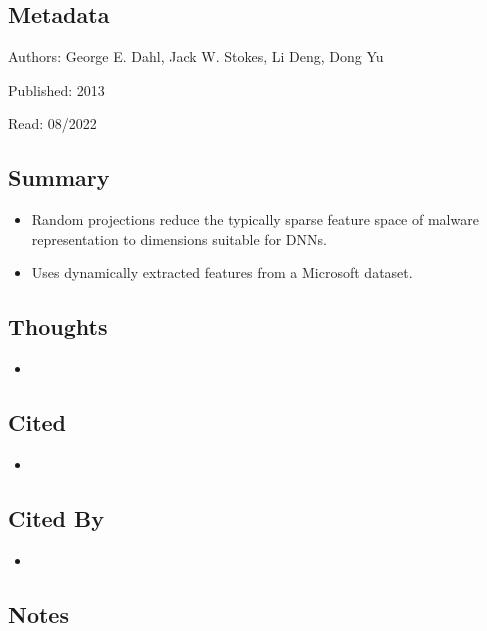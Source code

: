 \documentclass{article}
\begin{document}
\subsection*{Metadata}

\noindent Authors: George E. Dahl, Jack W. Stokes, Li Deng, Dong Yu

\noindent Published: 2013

\noindent Read: 08/2022

\subsection*{Summary}
\begin{itemize}
\item Random projections reduce the typically sparse feature space of malware representation to dimensions suitable for DNNs.
\item Uses dynamically extracted features from a Microsoft dataset.
\end{itemize}

\subsection*{Thoughts}
\begin{itemize}
\item
\end{itemize}

\subsection*{Cited}
\begin{itemize}
\item
\end{itemize}

\subsection*{Cited By}
\begin{itemize}
\item
\end{itemize}

\subsection*{Notes}
\end{document}
